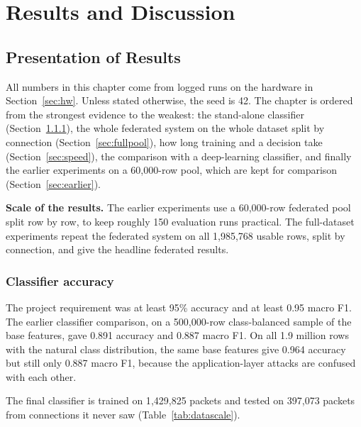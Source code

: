 \chapter{Results and Discussion}\label{chap:results}

\section{Presentation of Results}
All numbers in this chapter come from logged runs on the hardware in Section~\ref{sec:hw}. Unless stated otherwise, the seed is 42. The chapter is ordered from the strongest evidence to the weakest: the stand-alone classifier (Section~\ref{sec:clfacc}), the whole federated system on the whole dataset split by connection (Section~\ref{sec:fullpool}), how long training and a decision take (Section~\ref{sec:speed}), the comparison with a deep-learning classifier, and finally the earlier experiments on a 60{,}000-row pool, which are kept for comparison (Section~\ref{sec:earlier}).

\textbf{Scale of the results.} The earlier experiments use a 60{,}000-row federated pool split row by row, to keep roughly 150 evaluation runs practical. The full-dataset experiments repeat the federated system on all 1{,}985{,}768 usable rows, split by connection, and give the headline federated results.

\subsection{Classifier accuracy}\label{sec:clfacc}
The project requirement was at least 95\% accuracy and at least 0.95 macro F1. The earlier classifier comparison, on a 500{,}000-row class-balanced sample of the base features, gave 0.891 accuracy and 0.887 macro F1. On all 1.9 million rows with the natural class distribution, the same base features give 0.964 accuracy but still only 0.887 macro F1, because the application-layer attacks are confused with each other.

The final classifier is trained on 1{,}429{,}825 packets and tested on 397{,}073 packets from connections it never saw (Table~\ref{tab:datascale}).

